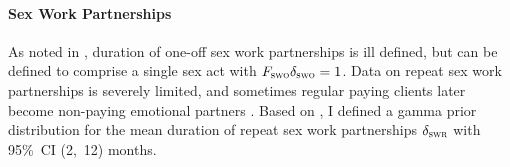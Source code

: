 \paragraph{Sex Work Partnerships}
As noted in , duration of one-off sex work partnerships
is ill defined, but can be defined to comprise a single sex act with
$F_{\textsc{swo}}\delta_{\textsc{swo}} = 1$.
Data on repeat sex work partnerships is severely limited, and
sometimes regular paying clients later become
non-paying emotional partners \cite{Voeten2007,Mbonye2022}.
Based on \cite{Voeten2002}, I defined a gamma prior distribution for
the mean duration of repeat sex work partnerships $\delta_{\textsc{swr}}$
with 95\%~CI (2,~12) months.
